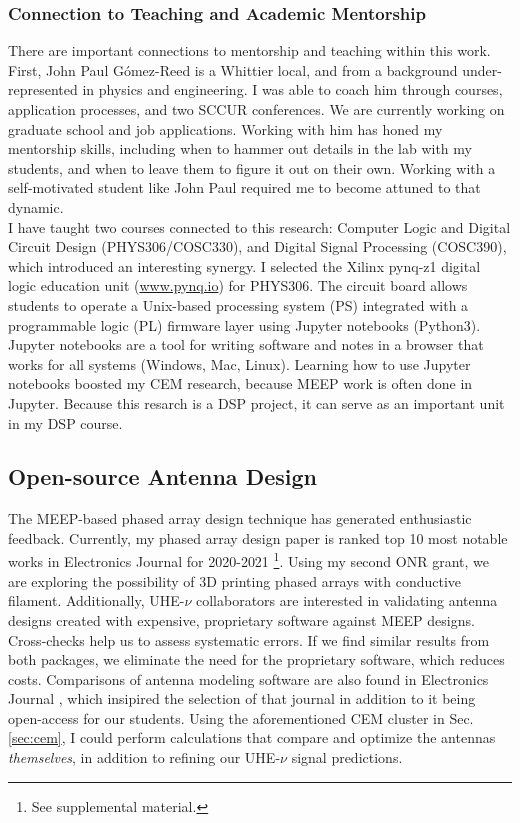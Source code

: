\documentclass[../../../main.tex]{subfiles}
\begin{document}
\subsubsection{Connection to Teaching and Academic Mentorship}

There are important connections to mentorship and teaching within this work.  First, John Paul G\'{o}mez-Reed is a Whittier local, and from a background under-represented in physics and engineering.  I was able to coach him through courses, application processes, and two SCCUR conferences.  We are currently working on graduate school and job applications.  Working with him has honed my mentorship skills, including when to hammer out details in the lab with my students, and when to leave them to figure it out on their own.  Working with a self-motivated student like John Paul required me to become attuned to that dynamic.
\\
\vspace{0.15cm}
I have taught two courses connected to this research: Computer Logic and Digital Circuit Design (PHYS306/COSC330), and Digital Signal Processing (COSC390), which introduced an interesting synergy.  I selected the Xilinx pynq-z1 digital logic education unit (\url{www.pynq.io}) for PHYS306.  The circuit board allows students to operate a Unix-based processing system (PS) integrated with a programmable logic (PL) firmware layer using Jupyter notebooks (Python3).  Jupyter notebooks are a tool for writing software and notes in a browser that works for all systems (Windows, Mac, Linux).  Learning how to use Jupyter notebooks boosted my CEM research, because MEEP work is often done in Jupyter.  Because this resarch is a DSP project, it can serve as an important unit in my DSP course.

\subsection{Open-source Antenna Design}

The MEEP-based phased array design technique has generated enthusiastic feedback.  Currently, my phased array design paper is ranked top 10 most notable works in Electronics Journal for 2020-2021 \cite{electronics10040415}\footnote{See supplemental material.}.  Using my second ONR grant, we are exploring the possibility of 3D printing phased arrays with conductive filament.  Additionally, UHE-$\nu$ collaborators are interested in validating antenna designs created with expensive, proprietary software against MEEP designs.  Cross-checks help us to assess systematic errors.  If we find similar results from both packages, we eliminate the need for the proprietary software, which reduces costs.  Comparisons of antenna modeling software are also found in Electronics Journal \cite{10.3390/electronics8121506}, which insipired the selection of that journal in addition to it being open-access for our students.  Using the aforementioned CEM cluster in Sec. \ref{sec:cem}, I could perform calculations that compare and optimize the antennas \textit{themselves}, in addition to refining our UHE-$\nu$ signal predictions.
\end{document}
